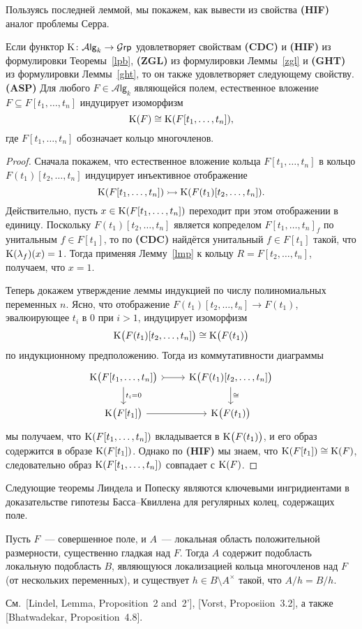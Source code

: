 \documentclass[oneside, 11pt]{amsart} \pdfoutput=1
\begin{document}
Пользуясь последней леммой, мы покажем, как вывести из свойства {\bf(HIF)} аналог проблемы Серра.
\begin{lemma}
\label{asp}
Если функтор ${\mathrm{K}}\colon\mathcal A\mathsf{lg}_k\rightarrow\mathcal G\mathsf{rp}$ удовлетворяет свойствам {\bf(CDC)} и {\bf(HIF)} из формулировки Теоремы~\ref{lpb}, {\bf(ZGL)} из формулировки Леммы~\ref{zgl} и {\bf(GHT)} из формулировки Леммы~\ref{ght}, то он также удовлетворяет следующему свойству.\\
{\bf(ASP)} Для любого $F\in\mathcal A\mathsf{lg}_k$ являющейся полем, естественное вложение $F\subseteq F[t_1,\ldots,t_n]$ индуцирует изоморфизм
$$
{\mathrm{K}}(F)\cong{\mathrm{K}}(F[t_1,\ldots,t_n]),
$$
где $F[t_1,\ldots,t_n]$ обозначает кольцо многочленов.
\end{lemma}
\begin{proof}
Сначала покажем, что естественное вложение кольца $F[t_1,\ldots,t_n]$ в кольцо $F(t_1)[t_2,\ldots,t_n]$ индуцирует инъективное отображение
$$
{\mathrm{K}}(F[t_1,\ldots,t_n])\rightarrowtail{\mathrm{K}}(F(t_1)[t_2,\ldots,t_n]).
$$
Действительно, пусть $x\in{\mathrm{K}}(F[t_1,\ldots,t_n])$ переходит при этом отображении в единицу. Поскольку $F(t_1)[t_2,\ldots,t_n]$ является копределом $F[t_1,\ldots,t_n]_f$ по унитальным $f\in F[t_1]$, то по {\bf(CDC)} найдётся унитальный $f\in F[t_1]$ такой, что ${\mathrm{K}}(\lambda_f)(x)=1$. Тогда применяя Лемму~\ref{lmp} к кольцу $R=F[t_2,\ldots,t_n]$, получаем, что $x=1$. 

Теперь докажем утверждение леммы индукцией по числу полиномиальных переменных $n$. Ясно, что отображение $F(t_1)[t_2,\ldots,t_n]\rightarrow F(t_1)$, эвалюирующее $t_i$ в $0$ при $i>1$, индуцирует изоморфизм
$$
{\mathrm{K}}\big(F(t_1)[t_2,\ldots,t_n]\big)\cong{\mathrm{K}}\big(F(t_1)\big)
$$
по индукционному предположению. Тогда из коммутативности диаграммы
$$\begin{tikzcd}
\K\bigl(F[t_1, \ldots, t_n]\bigr) \ar[tail]{r} \ar{d}{t_i=0} & \K\bigl(F(t_1)[t_2, \ldots, t_n]\bigr) \ar{d}{\cong}\\
\K\bigl(F[t_1]\bigr) \ar{r} & \K\bigl(F(t_1)\bigr)
\end{tikzcd}$$
мы получаем, что ${\mathrm{K}}(F[t_1,\ldots,t_n])$ вкладывается в ${\mathrm{K}}\big(F(t_1)\big)$, и его образ содержится в образе ${\mathrm{K}}(F[t_1])$. Однако по {\bf(HIF)} мы знаем, что ${\mathrm{K}}(F[t_1])\cong{\mathrm{K}}(F)$, следовательно образ ${\mathrm{K}}(F[t_1,\ldots,t_n])$ совпадает с ${\mathrm{K}}(F)$.
\end{proof}

Следующие теоремы Линдела и Попеску являются ключевыми ингридиентами в доказательстве гипотезы Басса--Квиллена для регулярных колец, содержащих поле. 
\begin{theorem}[Lindel]
\label{lindel}
Пусть $F$~--- совершенное поле, и $A$~--- локальная область положительной размерности, существенно гладкая над $F$. Тогда $A$ содержит подобласть локальную подобласть $B$, являющуюся локализацией кольца многочленов над $F$ {\rm(}от нескольких переменных{\rm)}, и существует $h\in B\setminus A^\times$ такой, что $A/h=B/h$. 
\end{theorem}
См.~[Lindel, Lemma, Proposition~2 and~2'], [Vorst, Proposiion~3.2], а также [Bhatwadekar, Proposition~4.8].
\end{document}
